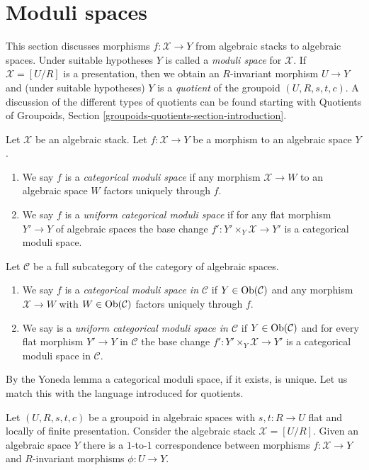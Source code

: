 \section{Moduli spaces}
\label{section-moduli-spaces}

\noindent
This section discusses morphisms $f : \mathcal{X} \to Y$ from
algebraic stacks to algebraic spaces. Under suitable hypotheses
$Y$ is called a {\it moduli space} for $\mathcal{X}$. If
$\mathcal{X} = [U/R]$ is a presentation, then we obtain an
$R$-invariant morphism $U \to Y$ and (under suitable hypotheses)
$Y$ is a {\it quotient} of the groupoid $(U, R, s, t, c)$.
A discussion of the different types of quotients can be found
starting with
Quotients of Groupoids, Section \ref{groupoids-quotients-section-introduction}.

\begin{definition}
\label{definition-categorical-quotient}
Let $\mathcal{X}$ be an algebraic stack. Let
$f : \mathcal{X} \to Y$ be a morphism to an algebraic space $Y$.
\begin{enumerate}
\item We say $f$ is a {\it categorical moduli space} if any morphism
$\mathcal{X} \to W$ to an algebraic space $W$ factors uniquely through $f$.
\item We say $f$ is a {\it uniform categorical moduli space}
if for any flat morphism $Y' \to Y$ of algebraic spaces the base change
$f' : Y' \times_Y \mathcal{X} \to Y'$ is a categorical moduli space.
\end{enumerate}
Let $\mathcal{C}$ be a full subcategory of the category of algebraic
spaces.
\begin{enumerate}
\item[(3)] We say $f$ is a {\it categorical moduli space in $\mathcal{C}$}
if $Y \in \mathop{\mathrm{Ob}}\nolimits(\mathcal{C})$ and any morphism $\mathcal{X} \to W$ with
$W \in \mathop{\mathrm{Ob}}\nolimits(\mathcal{C})$ factors uniquely through $f$.
\item[(4)] We say is a {\it uniform categorical moduli space in $\mathcal{C}$}
if $Y \in \mathop{\mathrm{Ob}}\nolimits(\mathcal{C})$ and for every flat morphism $Y' \to Y$ in
$\mathcal{C}$ the base change $f' : Y' \times_Y \mathcal{X} \to Y'$ is a
categorical moduli space in $\mathcal{C}$.
\end{enumerate}
\end{definition}

\noindent
By the Yoneda lemma a categorical moduli space, if it exists, is unique.
Let us match this with the language introduced for quotients.

\begin{lemma}
\label{lemma-quotient-compare}
Let $(U, R, s, t, c)$ be a groupoid in algebraic spaces with
$s, t : R \to U$ flat and locally of finite presentation.
Consider the algebraic stack $\mathcal{X} = [U/R]$.
Given an algebraic space $Y$ there is a $1$-to-$1$ correspondence between
morphisms $f : \mathcal{X} \to Y$ and $R$-invariant morphisms
$\phi : U \to Y$.
\end{lemma}

